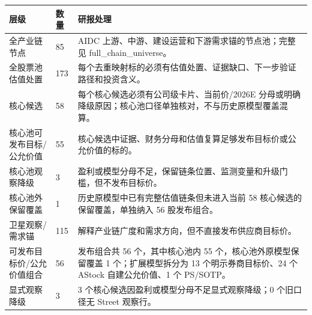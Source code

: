 \begin{exhibitbox}[全股票池估值处置漏斗]
\small
\begin{tabularx}{\linewidth}{L{4.2cm}R{2.0cm}X}
\toprule
\textbf{层级} & \textbf{数量} & \textbf{研报处理}\\
\midrule
全产业链节点 & 85 & AIDC 上游、中游、建设运营和下游需求锚的节点池；完整见 full\_chain\_universe。\\
全股票池估值处置 & 173 & 每个去重映射标的必须有估值处置、证据缺口、下一步验证路径和投资含义。\\
核心候选 & 58 & 每个核心候选必须有公司级卡片、当前价/2026E 分母或明确降级原因；核心池口径单独核对，不与历史原模型覆盖混算。\\
核心池可发布目标/公允价值 & 55 & 核心候选中证据、财务分母和估值复算足够发布目标价或公允价值的标的。\\
核心池观察降级 & 3 & 盈利或模型分母不足，保留链条位置、监测变量和升级门槛，但不发布目标价。\\
核心池外保留覆盖 & 1 & 历史原模型中已有完整估值链条但未进入当前 58 核心候选的保留覆盖，单独纳入 56 股发布组合。\\
卫星观察/需求锚 & 115 & 解释产业链广度和需求方向，但不直接发布供应商目标价。\\
可发布目标价/公允价值组合 & 56 & 发布组合共 56 个，其中核心池内 55 个，核心池外原模型保留覆盖 1 个；扩展模型拆分为 13 个明示券商目标价、24 个 AStock 自建公允价值、1 个 PS/SOTP。\\
显式观察降级 & 3 & 3 个核心候选因盈利或模型分母不足显式观察降级；0 个旧口径无 Street 观察行。\\
\bottomrule
\end{tabularx}
\end{exhibitbox}

